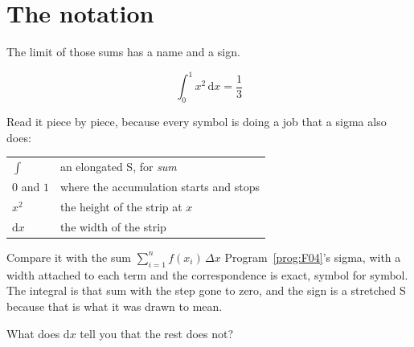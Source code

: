 \section{The notation}
\label{sec:F13-notation}

\begin{fr}
The limit of those sums has a name and a sign.

\[ \int_{0}^{1} x^{2}\,\mathrm{d}x = \frac{1}{3} \]

Read it piece by piece, because every symbol is doing a job that a sigma also
does:

\begin{center}
\begin{tabular}{ll}
\toprule
$\int$ & an elongated S, for \emph{sum} \\
$0$ and $1$ & where the accumulation starts and stops \\
$x^{2}$ & the height of the strip at $x$ \\
$\mathrm{d}x$ & the width of the strip \\
\bottomrule
\end{tabular}
\end{center}

Compare it with the sum $\sum_{i=1}^{n} f(x_i)\,\Delta x$ \dash{}
Program~\ref{prog:F04}'s sigma, with a width attached to each term \dash{} and
the correspondence is exact, symbol for symbol. The integral is that sum with
the step gone to zero, and the sign is a stretched S because that is what it
was drawn to mean.

What does $\mathrm{d}x$ tell you that the rest does not?
\nextframe
\end{fr}

